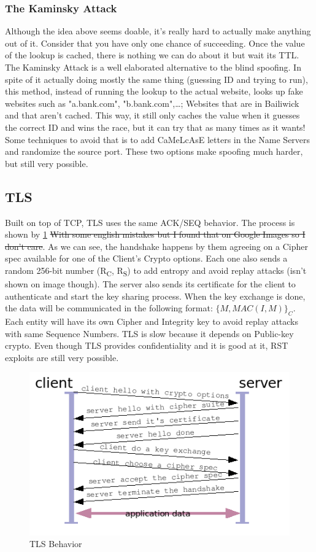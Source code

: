 \documentclass[11pt]{article}
\begin{document}
{\subsubsection{The Kaminsky Attack}
\label{sec:org7bd114b}
Although the idea above seems doable, it's really hard to actually make anything out of it. Consider that you have only one chance of succeeding. Once the value of the lookup is cached, there is nothing we can do about it but wait its TTL. The Kaminsky Attack is a well elaborated alternative to the blind spoofing. In spite of it actually doing mostly the same thing (guessing ID and trying to run), this method, instead of running the lookup to the actual website, looks up fake websites such as "a.bank.com", "b.bank.com",\ldots{}; Websites that are in Bailiwick and that aren't cached. This way, it still only caches the value when it guesses the correct ID and wins the race, but it can try that as many times as it wants! Some techniques to avoid that is to add CaMeLcAsE letters in the Name Servers and randomize the source port. These two options make spoofing much harder, but still very possible.

\subsection{TLS}
\label{sec:org5c0fb4a}
Built on top of TCP, TLS uses the same ACK/SEQ behavior. The process is shown by \ref{TLS} \sout{With some english mistakes but I found that on Google Images so I don't care}. As we can see, the handshake happens by them agreeing on a Cipher spec available for one of the Client's Crypto options. Each one also sends a random 256-bit number (R\textsubscript{C}, R\textsubscript{S}) to add entropy and avoid replay attacks (isn't shown on image though). The server also sends its certificate for the client to authenticate and start the key sharing process. When the key exchange is done, the data will be communicated in the following format: \(\{M,MAC(I, M)\}_C\). Each entity will have its own Cipher and Integrity key to avoid replay attacks with same Sequence Numbers. TLS is slow because it depends on Public-key crypto. Even though TLS provides confidentiality and it is good at it, RST exploits are still very possible.

\begin{figure}[htbp]
\centering
\includegraphics[height=0.5\textwidth]{res/TLS.png}
\caption{\label{TLS}
TLS Behavior}
\end{figure}

}
\end{document}
